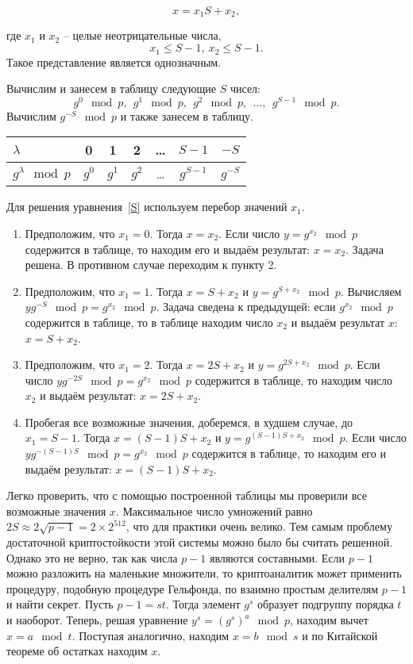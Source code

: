 \begin{equation}
    x=x_{1} S+x_{2},
    \label{S}
\end{equation}

где $x_{1}$ и $x_{2}$ -- целые неотрицательные числа,
    \[ x_{1} \le S-1, ~ x_{2} \le S-1. \]
Такое представление является однозначным.

Вычислим и занесем в таблицу следующие $S$ чисел:
    \[ g^{0} \mod p, ~~ g^{1} \mod p, ~~ g^{2} \mod p, ~~ \dots, ~~ g^{S-1} \mod p. \]
Вычислим $g^{-S} \mod p$ и также занесем в таблицу.

\begin{center} \begin{tabular}{|l|c|c|c|c|c|c|}
    \hline
    $\lambda $ & 0 & 1 & 2 & \dots & $S-1$ & $-S$ \\
    \hline
    $g^{\lambda} \mod p$ & $g^{0}$ & $g^{1}$ & $g^{2}$ & \dots & $g^{S-1}$ & $g^{-S}$ \\
    \hline
\end{tabular} \end{center}

Для решения уравнения~\ref{S} используем перебор значений $x_{1}$.
\begin{enumerate}
    \item Предположим, что $x_{1} = 0$. Тогда $x = x_{2}$. Если число $y = g^{x_{2}} \mod p$ содержится в таблице, то находим его и выдаём результат: $x=x_{2} $. Задача решена. В противном случае переходим к пункту 2.
    \item Предположим, что $x_{1} =1$. Тогда $x=S+x_{2} $ и $y=g^{S+x_{2}} \mod p$. Вычисляем $yg^{-S} \mod p=g^{x_{2}} \mod p$. Задача сведена к предыдущей: если $g^{x_{2} } \mod p$ содержится в таблице, то в таблице находим число $x_{2} $ и выдаём результат $x$: $x=S+x_{2} $.
    \item Предположим, что $x_{1} =2$. Тогда $x=2S+x_{2} $ и $y=g^{2S+x_{2} } \mod p$. Если число $yg^{-2S} \mod p=g^{x_{2} } \mod p$ содержится в таблице, то находим число $x_{2}$ и выдаём результат: $x = 2S + x_{2}$.
     \item Пробегая все возможные значения, доберемся, в худшем случае, до $x_{1} =S-1$. Тогда $x=(S-1)S+x_{2} $ и $y = g^{(S-1)S+x_{2} } \mod p$. Если число $yg^{-(S-1)S} \mod p=g^{x_{2}} \mod p$ содержится в таблице, то находим его и выдаём результат: $x=(S-1)S+x_{2}$.
\end{enumerate}

Легко проверить, что с помощью построенной таблицы мы проверили все возможные значения $x$. Максимальное число умножений равно $2S \approx 2\sqrt{p-1} =2\times 2^{512} $, что для практики очень велико. Тем самым проблему достаточной криптостойкости этой системы можно было бы считать решенной. Однако это не верно, так как числа $p-1$ являются составными. Если $p-1$ можно разложить на маленькие множители, то криптоаналитик может применить процедуру, подобную процедуре Гельфонда, по взаимно простым делителям $p-1$ и найти секрет. Пусть $p-1=st$. Тогда элемент $g^s$ образует подгруппу порядка $t$ и наоборот. Теперь, решая уравнение $y^s=(g^s)^a\mod p$, находим вычет $x=a\mod t$. Поступая аналогично, находим $x=b\mod s$ и по Китайской теореме об остатках находим $x$.

